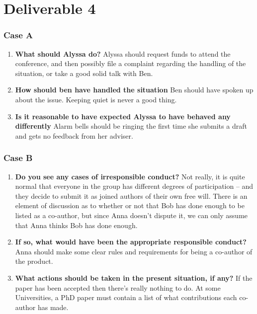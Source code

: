 \section{Deliverable 4}

\subsubsection{Case A}
 
\begin{enumerate}
  \item \textbf{What should Alyssa do?} 
    Alyssa should request funds to attend the conference, and then possibly file a complaint regarding the handling of the situation, or take a good solid talk with Ben.
  \item \textbf{How should ben have handled the situation} Ben should have spoken up about the issue. Keeping quiet is never a good thing.
  \item  \textbf{Is it reasonable to have expected Alyssa to have behaved any differently} Alarm bells should be ringing the first time she submits a draft and gets no feedback from her adviser.
\end{enumerate}

\subsubsection{Case B}
 
\begin{enumerate}
  \item  \textbf{Do you see any cases of irresponsible conduct?} Not really, it is quite normal that everyone in the group has different degrees of participation – and they decide to submit it as joined authors of their own free will. There is an element of discussion as to whether or not that Bob has done enough to be listed as a co-author, but since Anna doesn’t dispute it, we can only assume that Anna thinks Bob has done enough.
  \item  \textbf{If so, what would have been the appropriate responsible conduct?} Anna should make some clear rules and requirements for being a co-author of the product.
  \item  \textbf{What actions should be taken in the present situation, if any?} If the paper has been accepted then there’s really nothing to do. At some Universities, a PhD paper must contain a list of what contributions each co-author has made.
\end{enumerate}


